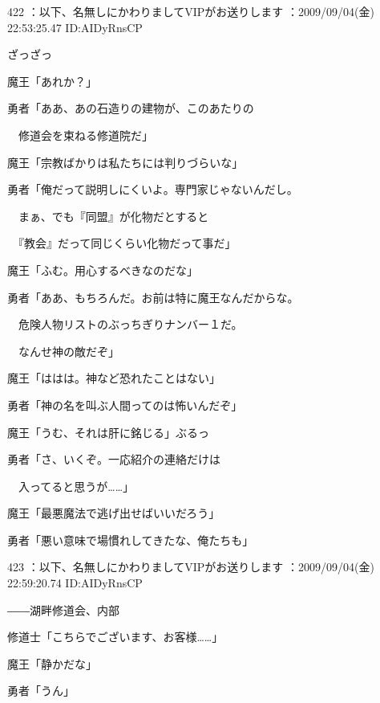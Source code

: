 \documentclass[a4j,twocolumn]{tarticle}
\begin{document}
	
    
    

422 ：以下、名無しにかわりましてVIPがお送りします ：2009/09/04(金) 22:53:25.47 ID:AIDyRnsCP 


ざっざっ 



魔王「あれか？」\par{} 
勇者「ああ、あの石造りの建物が、このあたりの\par{} 
　修道会を束ねる修道院だ」 



魔王「宗教ばかりは私たちには判りづらいな」\par{} 
勇者「俺だって説明しにくいよ。専門家じゃないんだし。\par{} 
　まぁ、でも『同盟』が化物だとすると\par{} 
　『教会』だって同じくらい化物だって事だ」 



魔王「ふむ。用心するべきなのだな」\par{} 
勇者「ああ、もちろんだ。お前は特に魔王なんだからな。\par{} 
　危険人物リストのぶっちぎりナンバー１だ。\par{} 
　なんせ神の敵だぞ」 



魔王「ははは。神など恐れたことはない」\par{} 
勇者「神の名を叫ぶ人間ってのは怖いんだぞ」\par{} 
魔王「うむ、それは肝に銘じる」ぶるっ 



勇者「さ、いくぞ。一応紹介の連絡だけは\par{} 
　入ってると思うが……」 



魔王「最悪魔法で逃げ出せばいいだろう」 



勇者「悪い意味で場慣れしてきたな、俺たちも」 

	
    
    

423 ：以下、名無しにかわりましてVIPがお送りします ：2009/09/04(金) 22:59:20.74 ID:AIDyRnsCP 


――湖畔修道会、内部 



修道士「こちらでございます、お客様……」 



魔王「静かだな」\par{} 
勇者「うん」 
\end{document}
